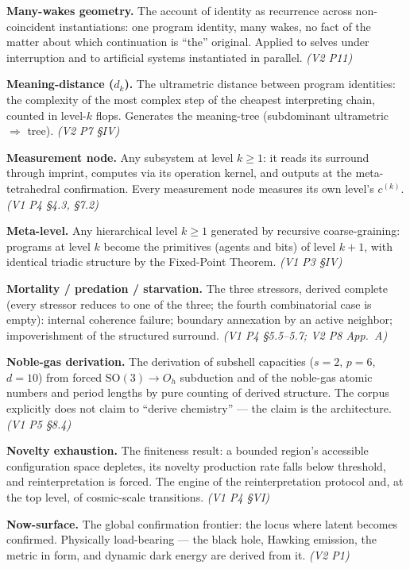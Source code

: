 \documentclass[11pt,oneside]{report}
\theoremstyle{definition}
\theoremstyle{remark}
\begin{document}
\textbf{Many-wakes geometry.} The account of identity as recurrence across non-coincident instantiations: one program identity, many wakes, no fact of the matter about which continuation is ``the'' original. Applied to selves under interruption and to artificial systems instantiated in parallel. \emph{(V2 P11)}

\textbf{Meaning-distance ($d_k$).} The ultrametric distance between program identities: the complexity of the most complex step of the cheapest interpreting chain, counted in level-$k$ flops. Generates the meaning-tree (subdominant ultrametric $\Rightarrow$ tree). \emph{(V2 P7 \S IV)}

\textbf{Measurement node.} Any subsystem at level $k \ge 1$: it reads its surround through imprint, computes via its operation kernel, and outputs at the meta-tetrahedral confirmation. Every measurement node measures its own level's $c^{(k)}$. \emph{(V1 P4 \S 4.3, \S 7.2)}

\textbf{Meta-level.} Any hierarchical level $k \ge 1$ generated by recursive coarse-graining: programs at level $k$ become the primitives (agents and bits) of level $k+1$, with identical triadic structure by the Fixed-Point Theorem. \emph{(V1 P3 \S IV)}

\textbf{Mortality / predation / starvation.} The three stressors, derived complete (every stressor reduces to one of the three; the fourth combinatorial case is empty): internal coherence failure; boundary annexation by an active neighbor; impoverishment of the structured surround. \emph{(V1 P4 \S 5.5--5.7; V2 P8 App.\ A)}

\textbf{Noble-gas derivation.} The derivation of subshell capacities ($s{=}2$, $p{=}6$, $d{=}10$) from forced $\mathrm{SO}(3)\to O_h$ subduction and of the noble-gas atomic numbers and period lengths by pure counting of derived structure. The corpus explicitly does not claim to ``derive chemistry'' --- the claim is the architecture. \emph{(V1 P5 \S 8.4)}

\textbf{Novelty exhaustion.} The finiteness result: a bounded region's accessible configuration space depletes, its novelty production rate falls below threshold, and reinterpretation is forced. The engine of the reinterpretation protocol and, at the top level, of cosmic-scale transitions. \emph{(V1 P4 \S VI)}

\textbf{Now-surface.} The global confirmation frontier: the locus where latent becomes confirmed. Physically load-bearing --- the black hole, Hawking emission, the metric in form, and dynamic dark energy are derived from it. \emph{(V2 P1)}
\end{document}
